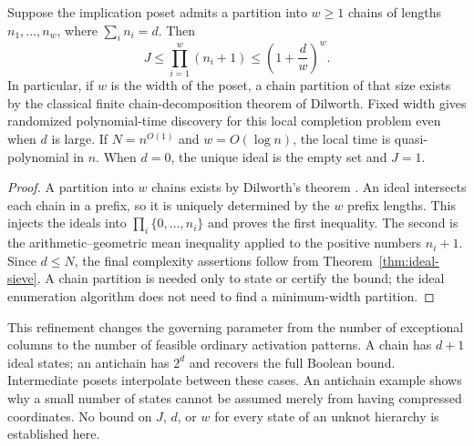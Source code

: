 \begin{corollary}\label{cor:ideal-width}
Suppose the implication poset admits a partition into $w\geq1$ chains
of lengths $n_1,\ldots,n_w$, where $\sum_i n_i=d$.  Then
\begin{equation}\label{eq:ideal-width}
       J\leq\prod_{i=1}^w(n_i+1)
               \leq\left(1+\frac d w\right)^w.
\end{equation}
In particular, if $w$ is the width of the poset, a chain partition of
that size exists by the classical finite chain-decomposition theorem of
Dilworth.  Fixed width gives randomized polynomial-time discovery for
this local completion problem even when $d$ is large.  If $N=n^{O(1)}$
and $w=O(\log n)$, the local time is quasi-polynomial in $n$.
When $d=0$, the unique ideal is the empty set and $J=1$.
\end{corollary}
\begin{proof}
A partition into $w$ chains exists by Dilworth's theorem
\cite{Dilworth1950}.  An ideal intersects each chain in a prefix, so it is uniquely determined
by the $w$ prefix lengths.  This injects the ideals into
$\prod_i\{0,\ldots,n_i\}$ and proves the first inequality.  The second
is the arithmetic--geometric mean inequality applied to the positive
numbers $n_i+1$.  Since $d\leq N$, the final complexity assertions follow
from Theorem~\ref{thm:ideal-sieve}.  A chain partition is needed only to
state or certify the bound; the ideal enumeration algorithm does not
need to find a minimum-width partition.
\end{proof}

This refinement changes the governing parameter from the number of
exceptional columns to the number of feasible ordinary activation patterns.
A chain has $d+1$ ideal states; an antichain has $2^d$ and recovers the full
Boolean bound.  Intermediate posets interpolate between these cases.
An antichain example shows why a small number of states cannot be assumed
merely from having compressed coordinates.  No bound on $J$, $d$, or $w$
for every state of an unknot hierarchy is established here.

